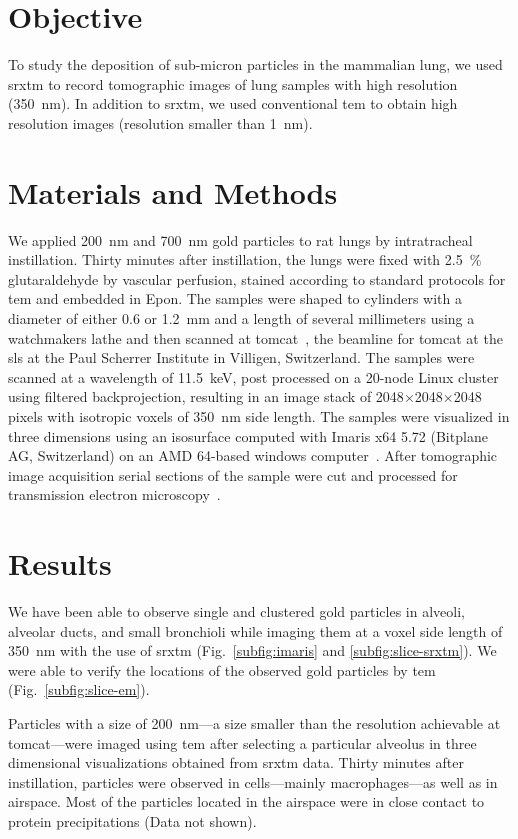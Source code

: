 \section{Objective}
To study the deposition of sub-micron particles in the mammalian lung, we used \ac{srxtm} to record tomographic images of lung samples with high resolution (\SI{350}{\nano\meter}). In addition to \ac{srxtm}, we used conventional \ac{tem} to obtain high resolution images (resolution smaller than \SI{1}{\nano\meter}).

\section{Materials and Methods}
We applied \SI{200}{\nano\meter} and \SI{700}{\nano\meter} gold particles to rat lungs by intratracheal instillation. Thirty minutes after instillation, the lungs were fixed with \SI{2.5}{\%} glutaraldehyde by vascular perfusion, stained according to standard protocols for \ac{tem} and embedded in Epon. The samples were shaped to cylinders with a diameter of either 0.6 or \SI{1.2}{\milli\meter} and a length of several millimeters using a watchmakers lathe and then scanned at \ac{tomcat}~\cite{Stampanoni2007}, the beamline for \acl{tomcat} at the \acl{sls} at the Paul Scherrer Institute in Villigen, Switzerland. The samples were scanned at a wavelength of \SI{11.5}{\kilo\electronvolt}, post processed on a 20-node Linux cluster using filtered backprojection, resulting in an image stack of 2048$\times$2048$\times$2048 pixels with isotropic voxels of \SI{350}{\nano\meter} side length. The samples were visualized in three dimensions using an isosurface computed with Imaris x64 5.72 (Bitplane AG, Switzerland) on an AMD 64-based windows computer~\cite{Tsuda2008}. After tomographic image acquisition serial sections of the sample were cut and processed for transmission electron microscopy~\cite{Mund2008}. 

\section{Results}
We have been able to observe single and clustered gold particles in alveoli, alveolar ducts, and small bronchioli while imaging them at a voxel side length of \SI{350}{\nano\meter} with the use of \ac{srxtm} (Fig.~\ref{subfig:imaris} and \ref{subfig:slice-srxtm}). We were able to verify the locations of the observed gold particles by \ac{tem} (Fig.~\ref{subfig:slice-em}). 

Particles with a size of \SI{200}{\nano\meter}---a size smaller than the resolution achievable at \ac{tomcat}---were imaged using \ac{tem} after selecting a particular alveolus in three dimensional visualizations obtained from \ac{srxtm} data. Thirty minutes after instillation, particles were observed in cells---mainly macrophages---as well as in airspace. Most of the particles located in the airspace were in close contact to protein precipitations (Data not shown).


